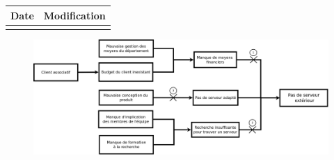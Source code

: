 \begin{table}[H]

\centering

	\begin{tabularx}{16.8cm}{|X|X|}

	\hline

	Date & Modification \\

	\hline

	  & \\

	\hline

	\end{tabularx}

\end{table}

\newpage


\begin{figure}
	\centering
	\includegraphics[scale=0.25]{images/AnalyseRisque_nPourquoi_FDR009}
\end{figure}
